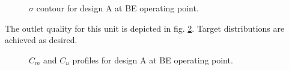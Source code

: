 \begin{figure}[h!]
\begin{minipage}[b]{1\linewidth}
 \centering
\end{minipage}
\caption{$\sigma$ contour for design A at BE operating point.}
\label{All_press}
\end{figure}


The outlet quality for this unit is depicted in fig. \ref{out_MAT}. Target distributions are achieved as desired.


\begin{figure}[h!]
\begin{minipage}[b]{1\linewidth}
 \centering
\end{minipage}
\caption{$C_m$ and $C_u$ profiles for design A at BE operating point.}
\label{out_MAT}
\end{figure}


